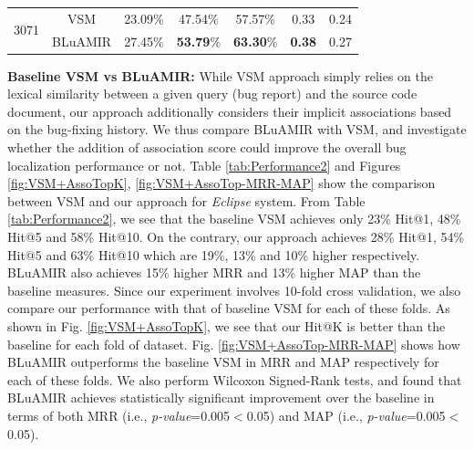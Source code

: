 \documentclass[sigconf,review,anonymous]{acmart}
\begin{document}
\begin{table}[!tb]
{\begin{tabular}{c|c|c|c|c|c|c}
			\multirow{2}{*}{3071}                                                                               & VSM & 23.09\% & 47.54\% & 57.57\% & 0.33 & 0.24 \\  \cline{2-7}   & BLuAMIR     & 27.45\%                                                 & \textbf{53.79}\%                                                 & \textbf{63.30}\%                                                  &   \textbf{0.38}  &  0.27    \\ 
			\hline
		\end{tabular}
		
	}
	\centering
\end{table}

\textbf{Baseline VSM vs BLuAMIR:} While VSM approach simply relies on the lexical similarity between a given query (bug report) and the source code document, our approach additionally considers their implicit associations based on the bug-fixing history.
We thus compare BLuAMIR with VSM, and investigate whether the addition of association score could improve the overall bug localization performance or not. Table \ref{tab:Performance2} and Figures \ref{fig:VSM+AssoTopK}, \ref{fig:VSM+AssoTop-MRR-MAP} show the comparison between VSM and our approach for \emph{Eclipse} system. From Table \ref{tab:Performance2}, we see that the baseline VSM achieves only 23\% Hit@1, 48\% Hit@5 and 58\% Hit@10. On the contrary, our approach achieves 28\% Hit@1, 54\% Hit@5 and 63\% Hit@10 which are 19\%, 13\% and 10\% higher respectively. BLuAMIR also achieves 15\% higher MRR and 13\% higher MAP than the baseline measures. Since our experiment involves 10-fold cross validation, we also compare our performance with that of baseline VSM for each of these folds. As shown in Fig. \ref{fig:VSM+AssoTopK}, we see that our Hit@K is better than the baseline for each fold of dataset. Fig. \ref{fig:VSM+AssoTop-MRR-MAP} shows how BLuAMIR outperforms the baseline VSM in MRR and MAP respectively for each of these folds. We also perform Wilcoxon Signed-Rank tests, and found that BLuAMIR achieves statistically significant improvement over the baseline in terms of both MRR (i.e., \emph{p-value}=0.005$<$0.05) and MAP (i.e., \emph{p-value}=0.005$<$0.05).
\end{document}
